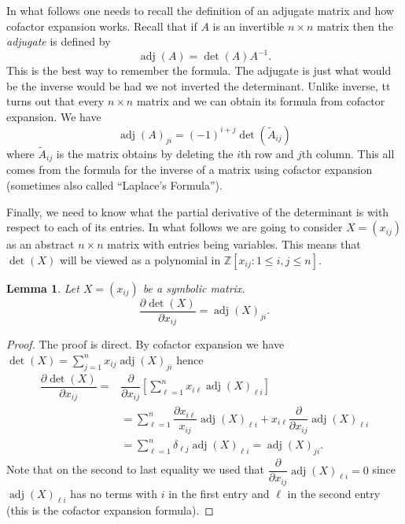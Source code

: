 \documentclass[]{book}
\numberwithin{equation}{section}
\newtheorem{lemma}[theorem]{Lemma}
\theoremstyle{definition}
\theoremstyle{remark}
\newcommand{\ZZ}{\mathbb{Z}}
\newcommand{\adj}{\operatorname{adj}}
\begin{document}
In what follows one needs to recall the definition of an adjugate matrix and how cofactor expansion works. 
Recall that if $A$ is an invertible $n\times n$ matrix then the \emph{adjugate} is defined by 
$$\adj(A) = \det(A) A^{-1}.$$
This is the best way to remember the formula.  
The adjugate is just what would be the inverse would be had we not inverted the determinant. 
Unlike inverse, tt turns out that every $n\times n$ matrix and we can obtain its formula from cofactor expansion. 
We have 
 $$ \adj(A)_{ji} = (-1)^{i+j} \det(\widetilde{A}_{ij})$$
where $\widetilde{A}_{ij}$ is the matrix obtains by deleting the $i$th row and $j$th column.
This all comes from the formula for the inverse of a matrix using cofactor expansion (sometimes also called ``Laplace's Formula'').

Finally, we need to know what the partial derivative of the determinant is with respect to each of its entries. 
In what follows we are going to consider $X = (x_{ij})$ as an abstract $n\times n$  matrix with entries being variables. 
This means that $\det(X)$ will be viewed as a polynomial in $\ZZ[x_{ij}\colon 1 \leq i,j \leq n ]$. 
\begin{lemma}
	Let $X =(x_{ij})$ be a symbolic matrix. 
	$$ \dfrac{\partial \det(X)}{\partial x_{ij}} = \adj(X)_{ji}. $$
\end{lemma}
\begin{proof}
	The proof is direct. 
	By cofactor expansion we have $\det(X) = \sum_{j=1}^n x_{ij} \adj(X)_{ji}$ hence
	 \begin{align*}
	 	\dfrac{\partial \det(X)}{\partial x_{ij}} = & \dfrac{\partial}{\partial x_{ij}} \left [ \sum_{\ell=1}^n x_{i\ell} \adj(X)_{\ell i}\right] \\
	 	&= \sum_{\ell=1}^n \dfrac{\partial x_{i\ell}}{x_{ij}} \adj(X)_{\ell i} + x_{i\ell} \dfrac{\partial }{\partial x_{ij}} \adj(X)_{\ell i} \\
	 	&= \sum_{\ell=1}^n \delta_{\ell j} \adj(X)_{\ell i} = \adj(X)_{ji}.
	 \end{align*}
 	Note that on the second to last equality we used that $\dfrac{\partial }{\partial x_{ij}} \adj(X)_{\ell i}=0$ since $\adj(X)_{\ell i}$ has no terms with $i$ in the first entry and $\ell$ in the second entry (this is the cofactor expansion formula).
\end{proof}
\end{document}
